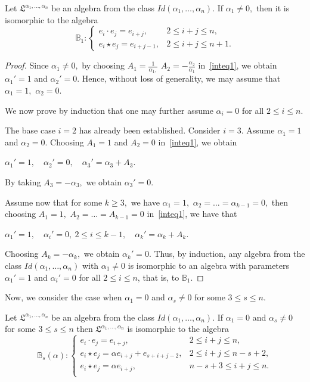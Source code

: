 \documentclass{jonasart}
\begin{document}
	\begin{lemma}\label{intlem1} Let $\mathfrak{L}^{\alpha_1,\dots,\alpha_n}$ be an algebra from the class $Id(\alpha_1,\dots,\alpha_n )$. If $\alpha_1\neq0,$ then it is isomorphic to the algebra
		\[
			\mathbb{B}_1:
			\left\{
			\begin{array}{ll}
				e_i \cdot e_j =e_{i+j}, & 2\leq i+j \leq n, \\[1mm]
				e_i \star e_j =e_{i+j-1}, & 2\leq i+j \leq n+1.
			\end{array}
			\right.
		\]
	\end{lemma}

	\begin{proof}
		Since $\alpha_1\neq0,$ by choosing $A_1 = \frac{1}{\alpha_1,}$ $A_2 = -\frac{\alpha_2}{\alpha_1}$ in~\eqref{inteq1}, we obtain $\alpha_1 '=1$ and $\alpha_2 '=0.$ Hence, without loss of generality, we may assume that $\alpha_1 =1,$ $\alpha_2 =0.$

		We now prove by induction that one may further assume $\alpha_i = 0$ for all $2 \le i \le n$.

		The base case $i=2$ has already been established. Consider $i=3$. Assume $\alpha_1 = 1$ and $\alpha_2 = 0$. Choosing $A_1 = 1$ and $A_2 = 0$ in~\eqref{inteq1}, we obtain
		\begin{center}
			$\alpha_1 '=1, \quad \alpha_2 '=0, \quad \alpha_3 '=\alpha_3 + A_3.$
		\end{center}
		By taking $A_3 =-\alpha_3,$ we obtain $\alpha_3 '=0.$

		Assume now that for some $k \ge 3,$ we have $\alpha_1 =1,$ $\alpha_2 = \dots= \alpha_{k-1}=0,$ then choosing $A_1 = 1,$ $A_2 =\dots=A_{k-1}=0$
		in~\eqref{inteq1}, we have that
		\begin{center}
			$\alpha_1 '=1, \quad \alpha_i '=0, \ 2 \leq i \leq k-1, \quad \alpha_k '=\alpha_k + A_k.$
		\end{center}
		Choosing $A_k =-\alpha_k,$ we obtain $\alpha_k '=0.$
		Thus, by induction, any algebra from the class $Id(\alpha_1,\dots,\alpha_n )$ with $\alpha_1 \neq 0$ is isomorphic to an algebra with parameters $\alpha_1 ' = 1$ and $\alpha_i ' = 0$ for all $2 \le i \le n$, that is, to $\mathbb{B}_1$.
	\end{proof}

	Now, we consider the case when $\alpha_1 =0$ and $\alpha_s \neq 0$ for some $ 3 \le s \le n.$

	\begin{lemma}\label{intlem2} Let $\mathfrak{L}^{\alpha_1,\dots,\alpha_n}$ be an algebra from the class $Id(\alpha_1,\dots,\alpha_n )$. If $\alpha_1 =0$ and $\alpha_s \neq 0$ for some $3 \le s \le n$ then $\mathfrak{L}^{\alpha_1,\dots,\alpha_n}$ is isomorphic to the algebra
		\[
			\mathbb{B}_s (\alpha):\left\{
			\begin{array}{ll}
				e_i \cdot e_j =e_{i+j}, & 2\leq i+j \leq n, \\[1mm]
				e_i \star e_j = \alpha e_{i+j} + e_{s+i+j-2}, & 2\leq i+j \leq n-s+2, \\[1mm]
				e_i \star e_j = \alpha e_{i+j}, & n-s+3\leq i+j \leq n.\\[1mm]
			\end{array}
			\right.
		\]
	\end{lemma}
\end{document}
